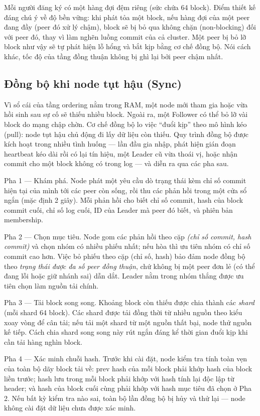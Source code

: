Mỗi người đăng ký có một hàng đợi đệm riêng (sức chứa 64 block). Điểm thiết kế đáng
chú ý về độ bền vững: khi phát tỏa một block, nếu hàng đợi của một peer đang đầy
(peer đó xử lý chậm), block sẽ bị bỏ qua không chặn (non-blocking) đối với
peer đó, thay vì làm nghẽn luồng commit của cả cluster. Một peer bị bỏ lỡ block như
vậy sẽ tự phát hiện lỗ hổng và bắt kịp bằng cơ chế đồng bộ. Nói cách khác, tốc độ
của tầng đồng thuận không bị ghì lại bởi peer chậm nhất.

\subsection{Đồng bộ khi node tụt hậu (Sync)}
\label{sec:deliver-sync}

Vì sổ cái của tầng ordering nằm trong RAM, một node mới tham gia hoặc vừa hồi sinh
sau sự cố sẽ thiếu nhiều block. Ngoài ra, một Follower có thể bỏ lỡ vài block do
mạng chập chờn. Cơ chế đồng bộ lo việc ``đuổi kịp'' theo mô hình
kéo (pull): node tụt hậu chủ động đi lấy dữ liệu còn thiếu. Quy trình đồng
bộ được kích hoạt trong nhiều tình huống --- lần đầu gia nhập, phát hiện gián đoạn
heartbeat kéo dài rồi có lại tín hiệu, một Leader cũ vừa thoái vị, hoặc nhận commit
cho một block không có trong log --- và diễn ra qua các pha sau.

Pha 1 --- Khám phá. Node phát một yêu cầu dò trạng thái kèm chỉ số commit
hiện tại của mình tới các peer còn sống, rồi thu các phản hồi trong một cửa sổ ngắn
(mặc định 2 giây). Mỗi phản hồi cho biết chỉ số commit, hash của block commit cuối,
chỉ số log cuối, ID của Leader mà peer đó biết, và phiên bản membership.

Pha 2 --- Chọn mục tiêu. Node gom các phản hồi theo cặp
\textit{(chỉ số commit, hash commit)} và chọn nhóm có nhiều phiếu nhất;
nếu hòa thì ưu tiên nhóm có chỉ số commit cao hơn. Việc bỏ phiếu theo cặp
(chỉ số, hash) bảo đảm node đồng bộ theo \textit{trạng thái được đa số peer đồng
thuận}, chứ không bị một peer đơn lẻ (có thể đang lỗi hoặc giữ nhánh sai) dẫn dắt.
Leader nằm trong nhóm thắng được ưu tiên chọn làm nguồn tải chính.

Pha 3 --- Tải block song song. Khoảng block còn thiếu được chia thành các
\textit{shard} (mỗi shard 64 block). Các shard được tải đồng thời từ nhiều
nguồn theo kiểu xoay vòng để cân tải; nếu tải một shard từ một nguồn thất bại, node
thử nguồn kế tiếp. Cách chia shard song song này rút ngắn đáng kể thời gian đuổi
kịp khi cần tải hàng nghìn block.

Pha 4 --- Xác minh chuỗi hash. Trước khi cài đặt, node kiểm tra tính toàn
vẹn của toàn bộ dãy block tải về: prev hash của mỗi block phải khớp hash của block
liền trước; hash lưu trong mỗi block phải khớp với hash tính lại độc lập từ header;
và hash của block cuối cùng phải khớp với hash mục tiêu đã chọn ở Pha 2. Nếu bất kỳ
kiểm tra nào sai, toàn bộ lần đồng bộ bị hủy và thử lại --- node không cài đặt dữ
liệu chưa được xác minh.

